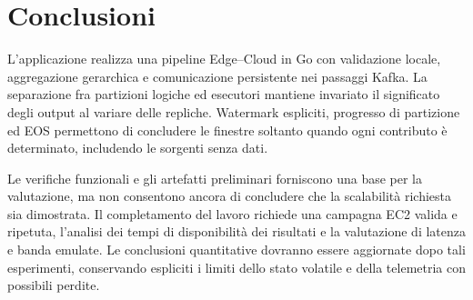 \section{Conclusioni}
L'applicazione realizza una pipeline Edge--Cloud in Go con validazione locale,
aggregazione gerarchica e comunicazione persistente nei passaggi Kafka. La
separazione fra partizioni logiche ed esecutori mantiene invariato il
significato degli output al variare delle repliche. Watermark espliciti,
progresso di partizione ed EOS permettono di concludere le finestre soltanto
quando ogni contributo è determinato, includendo le sorgenti senza dati.

Le verifiche funzionali e gli artefatti preliminari forniscono una base per
la valutazione, ma non consentono ancora di concludere che la scalabilità
richiesta sia dimostrata. Il completamento del lavoro richiede una campagna
EC2 valida e ripetuta, l'analisi dei tempi di disponibilità dei risultati e
la valutazione di latenza e banda emulate. Le conclusioni quantitative
dovranno essere aggiornate dopo tali esperimenti, conservando espliciti i
limiti dello stato volatile e della telemetria con possibili perdite.
